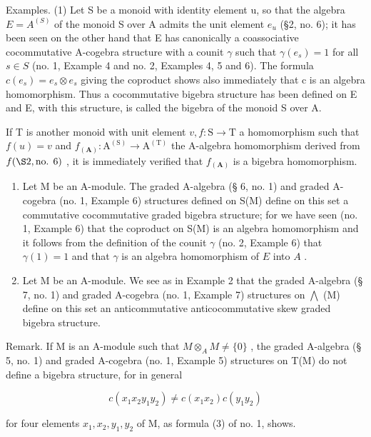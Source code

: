 Examples. (1) Let S be a monoid with identity element u, so that the algebra \(E = A^{(S)}\) of the monoid S over A admits the unit element \(e_{u}\) (§2, no. 6); it has been seen on the other hand that E has canonically a coassociative cocommutative A-cogebra structure with a counit \(\gamma\) such that \(\gamma(e_{s}) = 1\) for all \(s \in S\) (no. 1, Example 4 and no. 2, Examples 4, 5 and 6). The formula \(c(e_{s}) = e_{s} \otimes e_{s}\) giving the coproduct shows also immediately that c is an algebra homomorphism. Thus a cocommutative bigebra structure has been defined on E and E, with this structure, is called the bigebra of the monoid S over A.

If T is another monoid with unit element \(v, f: \mathrm{S} \to \mathrm{T}\) a homomorphism such that \(f(u) = v\) and \(f_{(\mathbf{A})}: \mathrm{A}^{(\mathrm{S})} \to \mathrm{A}^{(\mathrm{T})}\) the A-algebra homomorphism derived from \(f(\S 2, \text{no. } 6)\) , it is immediately verified that \(f_{(\mathbf{A})}\) is a bigebra homomorphism.

\begin{enumerate}
\def\labelenumi{(\arabic{enumi})}
\setcounter{enumi}{1}
\item
  Let M be an A-module. The graded A-algebra (§ 6, no. 1) and graded A-cogebra (no. 1, Example 6) structures defined on S(M) define on this set a commutative cocommutative graded bigebra structure; for we have seen (no. 1, Example 6) that the coproduct on S(M) is an algebra homomorphism and it follows from the definition of the counit \(\gamma\) (no. 2, Example 6) that \(\gamma(1) = 1\) and that \(\gamma\) is an algebra homomorphism of \(E\) into \(A\) .
\item
  Let M be an A-module. We see as in Example 2 that the graded A-algebra (§ 7, no. 1) and graded A-cogebra (no. 1, Example 7) structures on \(\bigwedge\) (M) define on this set an anticommutative anticocommutative skew graded bigebra structure.
\end{enumerate}

Remark. If M is an A-module such that \(M \otimes_{A} M \neq \{0\}\) , the graded A-algebra (§ 5, no. 1) and graded A-cogebra (no. 1, Example 5) structures on T(M) do not define a bigebra structure, for in general

\[
c (x _ {1} x _ {2} y _ {1} y _ {2}) \neq c (x _ {1} x _ {2}) c (y _ {1} y _ {2})
\]

for four elements \(x_{1}, x_{2}, y_{1}, y_{2}\) of M, as formula (3) of no. 1, shows.

